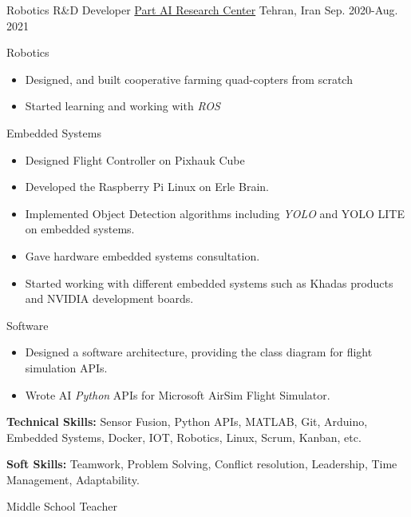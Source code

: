 \begin{cventries}
  
  \cventry
{Robotics R\&D Developer}  %
    {\href{https://ir.linkedin.com/company/partdp-ai}{Part AI Research Center}} %
    {Tehran, Iran} %
    {Sep. 2020-Aug. 2021} %
    {
      \begin{cvitems} %
                \item{Robotics}
        \begin{itemize}[label= - ]
            \item {Designed, and built cooperative farming quad-copters from scratch}
             \item {Started learning and working with \textit{ROS}}
        \end{itemize}
        \item{Embedded Systems}
        \begin{itemize}[label=-]
            \item {Designed Flight Controller on Pixhauk Cube}
            \item {Developed the Raspberry Pi Linux on Erle Brain.}
            \item {Implemented Object Detection algorithms including \textit{YOLO} and YOLO LITE on embedded systems.}
            \item {Gave hardware embedded systems consultation.}
            \item {Started working with different embedded systems such as Khadas products and NVIDIA development boards.}
        \end{itemize}
        \item{Software}
        \begin{itemize}[label = -]
        \item {Designed a software architecture, providing the class diagram for flight simulation APIs.}
            \item {Wrote AI \textit{Python} APIs for Microsoft AirSim Flight Simulator.}
        \end{itemize}
        \item {\textbf{Technical Skills:} Sensor Fusion, Python APIs, MATLAB, Git, Arduino, Embedded Systems, Docker, IOT, Robotics, Linux, Scrum, Kanban, etc.}
        \item {\textbf{Soft Skills:} Teamwork, Problem Solving, Conflict resolution, Leadership, Time Management, Adaptability.}
      \end{cvitems}
    } 
\cventry
    {Middle School Teacher}

\end{cventries}
